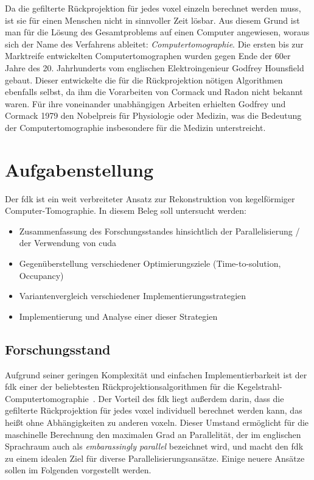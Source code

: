 Da die gefilterte Rückprojektion für jedes \gls{voxel} einzeln berechnet werden muss, ist sie für einen Menschen nicht
in sinnvoller Zeit lösbar. Aus diesem Grund ist man für die Lösung des Gesamtproblems auf einen Computer angewiesen,
woraus sich der Name des Verfahrens ableitet: \textit{Computertomographie}. Die ersten bis zur Marktreife entwickelten
Computertomographen wurden gegen Ende der 60er Jahre des 20. Jahrhunderts vom englischen Elektroingenieur Godfrey
Hounsfield gebaut. Dieser entwickelte die für die Rückprojektion nötigen Algorithmen ebenfalls selbst, da ihm die
Vorarbeiten von Cormack und Radon nicht bekannt waren. Für ihre voneinander unabhängigen Arbeiten
erhielten Godfrey und Cormack 1979 den Nobelpreis für Physiologie oder Medizin, was die Bedeutung der
Computertomographie insbesondere für die Medizin unterstreicht.

\section{Aufgabenstellung}

Der \gls{fdk} ist ein weit verbreiteter Ansatz zur Rekonstruktion von kegelförmiger Computer-Tomographie. In diesem
Beleg soll untersucht werden:

\begin{itemize}
    \item Zusammenfassung des Forschungsstandes hinsichtlich der Parallelisierung / der Verwendung von \gls{cuda}
    \item Gegenüberstellung verschiedener Optimierungsziele (Time-to-solution, Occupancy)
    \item Variantenvergleich verschiedener Implementierungsstrategien
    \item Implementierung und Analyse einer dieser Strategien
\end{itemize}

\subsection{Forschungsstand}\label{ssec:forschungsstand}

Aufgrund seiner geringen Komplexität und einfachen Implementierbarkeit ist der \gls{fdk} einer der beliebtesten
Rückprojektionsalgorithmen für die Kegelstrahl-Computertomographie~\cite{xumuell}. Der Vorteil des \gls{fdk} liegt
außerdem darin, dass die gefilterte Rückprojektion für jedes \gls{voxel} individuell berechnet werden kann, das heißt
ohne Abhängigkeiten zu anderen \gls{voxel}n. Dieser Umstand ermöglicht für die maschinelle Berechnung den maximalen Grad
an Parallelität, der im englischen Sprachraum auch als \textit{embarassingly parallel} bezeichnet wird, und macht den
\gls{fdk} zu einem idealen Ziel für diverse Parallelisierungsansätze. Einige neuere Ansätze sollen im Folgenden
vorgestellt werden.

